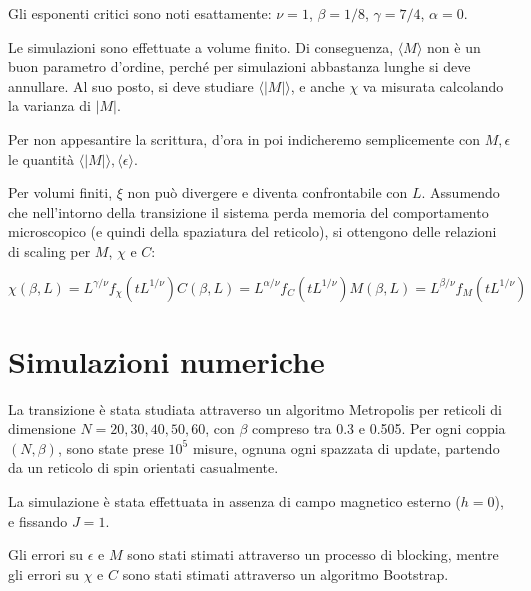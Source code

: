 \documentclass[a4paper,11pt]{article}
\newcommand{\avg}[1]{\langle {#1} \rangle}
\begin{document}
		Gli esponenti critici sono noti esattamente: $\nu = 1$, $\beta = 1/8$,
		$\gamma = 7/4$, $\alpha = 0$.

		Le simulazioni sono effettuate a volume finito. Di conseguenza, $\avg{M}$ non è un buon parametro d'ordine, perché per simulazioni abbastanza lunghe si deve annullare. Al suo posto, si deve studiare $\avg{|M|}$, e anche $\chi$ va misurata calcolando la varianza di $|M|$.
		
		Per non appesantire la scrittura, d'ora in poi indicheremo semplicemente con $M, \epsilon$ le quantità $\avg{|M|}, \avg{\epsilon}$.
		
		Per volumi finiti, $\xi$ non può divergere e diventa confrontabile
		con $L$. Assumendo che nell'intorno della transizione il sistema perda
		memoria del comportamento microscopico (e quindi della spaziatura del
		reticolo),
		si ottengono delle relazioni di scaling per $M$, $\chi$ e $C$:

		\begin{subequations}
		  \begin{equation}
			\chi(\beta, L) = L^{\gamma/\nu} f_\chi (tL^{1/\nu})
		  \end{equation}
		  \begin{equation}
			C(\beta, L) = L^{\alpha/\nu} f_C (tL^{1/\nu})
		  \end{equation}
		  \begin{equation}
			M(\beta, L) = L^{\beta/\nu} f_M(tL^{1/\nu})
		  \end{equation}
		  \label{eqn:fs_scaling}
		\end{subequations}

	\section{Simulazioni numeriche}

	La transizione è stata studiata attraverso un algoritmo Metropolis per
	reticoli di dimensione $N = 20,30,40,50,60$, con $\beta$ compreso tra 0.3 e
	0.505. Per ogni coppia $(N, \beta )$,
	sono state prese $10^{5}$ misure, ognuna ogni spazzata di update, partendo da un reticolo di spin orientati casualmente. 

	La simulazione è stata effettuata in assenza di campo magnetico esterno
	($h = 0$), e fissando $J = 1$.

	Gli errori su $\epsilon$ e $M$ sono stati
	stimati attraverso un processo di blocking, mentre gli errori su $\chi$ e $C$ sono stati stimati attraverso un algoritmo Bootstrap.
\end{document}
